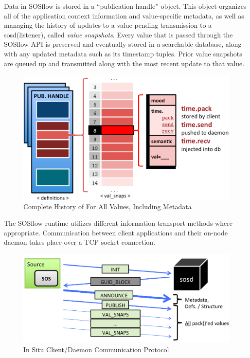 Data in SOSflow is stored in a ``publication handle'' object.
%
This object organizes all of the application context information and
value-specific metadata, as well as managing the history of updates to
a value pending transmission to a sosd(listener), called
\textit{value snapshots}.
%
Every value that is passed through the SOSflow API is preserved and
eventually stored in a searchable database, along with any updated
metadata such as its timestamp tuples.
%
%
Prior value snapshots are queued up and transmitted along
with the most recent update to that value.
\begin{figure}[h]
\centering
\includegraphics[width=\columnwidth]{images/val_snaps.png}
\caption{Complete History of For All Values, Including Metadata}
\label{fig_val_snaps}
\end{figure}
%
\par
%
The SOSflow runtime utilizes different information transport methods
where appropriate.
%
Communication between client applications and their on-node daemon
takes place over a TCP socket connection.
%
\begin{figure}[h]
\centering
\includegraphics[width=\columnwidth]{images/sosd_protocol.png}
\caption{In Situ Client/Daemon Communication Protocol}
\label{fig_sosd_protocol}
\end{figure}
